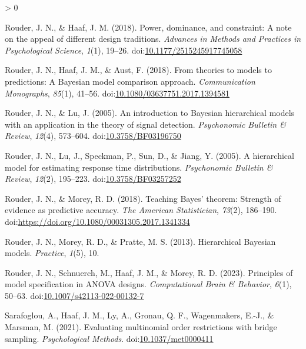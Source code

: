 \documentclass[
  english,
  doc,floatsintext]{apa6}
\newlength{\cslhangindent}
\newenvironment{CSLReferences}[2] %
 {%
  \setlength{\parindent}{0pt}
  \ifodd #1 \everypar{\setlength{\hangindent}{\cslhangindent}}\ignorespaces\fi
  \ifnum #2 > 0
  \setlength{\parskip}{#2\baselineskip}
  \fi
 }%
 {}
\begin{document}
\begin{CSLReferences}{1}{0}
\leavevmode\hypertarget{ref-rouder2018power}{}%
Rouder, J. N., \& Haaf, J. M. (2018). Power, dominance, and constraint: A note on the appeal of different design traditions. \emph{Advances in Methods and Practices in Psychological Science}, \emph{1}(1), 19--26. doi:\href{https://doi.org/10.1177/2515245917745058}{10.1177/2515245917745058}

\leavevmode\hypertarget{ref-rouder2018theories}{}%
Rouder, J. N., Haaf, J. M., \& Aust, F. (2018). From theories to models to predictions: A {Bayesian} model comparison approach. \emph{Communication Monographs}, \emph{85}(1), 41--56. doi:\href{https://doi.org/10.1080/03637751.2017.1394581}{10.1080/03637751.2017.1394581}

\leavevmode\hypertarget{ref-rouder2005introduction}{}%
Rouder, J. N., \& Lu, J. (2005). An introduction to {Bayesian} hierarchical models with an application in the theory of signal detection. \emph{Psychonomic Bulletin \& Review}, \emph{12}(4), 573--604. doi:\href{https://doi.org/10.3758/BF03196750}{10.3758/BF03196750}

\leavevmode\hypertarget{ref-rouder2005hierarchical}{}%
Rouder, J. N., Lu, J., Speckman, P., Sun, D., \& Jiang, Y. (2005). A hierarchical model for estimating response time distributions. \emph{Psychonomic Bulletin \& Review}, \emph{12}(2), 195--223. doi:\href{https://doi.org/10.3758/BF03257252}{10.3758/BF03257252}

\leavevmode\hypertarget{ref-rouder2018teaching}{}%
Rouder, J. N., \& Morey, R. D. (2018). Teaching {Bayes}' theorem: Strength of evidence as predictive accuracy. \emph{The American Statistician}, \emph{73}(2), 186--190. doi:\url{https://doi.org/10.1080/00031305.2017.1341334}

\leavevmode\hypertarget{ref-rouder2013hierarchical}{}%
Rouder, J. N., Morey, R. D., \& Pratte, M. S. (2013). Hierarchical {Bayesian} models. \emph{Practice}, \emph{1}(5), 10.

\leavevmode\hypertarget{ref-rouder2023principles}{}%
Rouder, J. N., Schnuerch, M., Haaf, J. M., \& Morey, R. D. (2023). Principles of model specification in ANOVA designs. \emph{Computational Brain \& Behavior}, \emph{6}(1), 50--63. doi:\href{https://doi.org/10.1007/s42113-022-00132-7}{10.1007/s42113-022-00132-7}

\leavevmode\hypertarget{ref-sarafoglou2021evaluating}{}%
Sarafoglou, A., Haaf, J. M., Ly, A., Gronau, Q. F., Wagenmakers, E.-J., \& Marsman, M. (2021). Evaluating multinomial order restrictions with bridge sampling. \emph{Psychological Methods}. doi:\href{https://doi.org/10.1037/met0000411}{10.1037/met0000411}


\end{CSLReferences}
\end{document}
